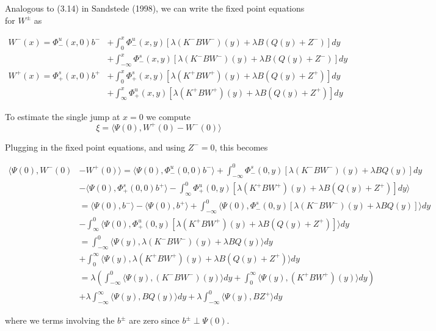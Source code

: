 \documentclass[12pt]{article}
\begin{document}
Analogous to (3.14) in Sandstede (1998), we can write the fixed point equations for $W^\pm$ as

\begin{align*}
W^-(x) = \Phi^u_-(x, 0)b^- &+ \int_0^x \Phi^u_-(x, y)[\lambda (K^- B W^-)(y) + \lambda B (Q(y) + Z^-) ] dy \\
&+ \int_{-\infty}^x \Phi^s_-(x, y)[\lambda (K^- B W^-)(y) + \lambda B (Q(y) + Z^-)] dy \\
W^+(x) = \Phi^s_+(x, 0)b^+ &+ \int_0^x \Phi^s_+(x, y)[\lambda (K^+ B W^+)(y) + \lambda B(Q(y) + Z^+)] dy \\
&+ \int_{\infty}^x \Phi^u_+(x, y)[\lambda (K^+ B W^+)(y) + \lambda B (Q(y) + Z^+) ] dy
\end{align*}

To estimate the single jump at $x = 0$ we compute
\[
\xi = \langle \Psi(0), W^+(0) - W^-(0) \rangle
\]

Plugging in the fixed point equations, and using $Z^- = 0$, this becomes

\begin{align*}
\langle\Psi(0), W^-(0) &- W^+(0)\rangle = \langle \Psi(0), \Phi^u_-(0, 0)b^- \rangle + \int_{-\infty}^0 \Phi^s_-(0, y)[\lambda (K^- B W^-)(y) + \lambda B Q(y) ] dy  \\
&- \langle \Psi(0), \Phi^s_+(0, 0)b^+ \rangle - \int_\infty^0 \Phi^u_+(0, y)[\lambda (K^+ B W^+)(y) + \lambda B (Q(y) + Z^+) ] dy \rangle\\
&= \langle \Psi(0), b^- \rangle - \langle \Psi(0), b^+ \rangle + \int_{-\infty}^0 \langle \Psi(0), \Phi^s_-(0, y)[\lambda (K^- B W^-)(y) + \lambda B Q(y) ] \rangle dy  \\
&- \int_\infty^0 \langle \Psi(0), \Phi^u_+(0, y)[\lambda (K^+ B W^+)(y) + \lambda B (Q(y) + Z^+) ] \rangle dy  \\
&= \int_{-\infty}^0 \langle \Psi(y), \lambda (K^- B W^-)(y) + \lambda B Q(y) \rangle dy \\
&+ \int_0^\infty \langle \Psi(y), \lambda (K^+ B W^+)(y) + \lambda B (Q(y) + Z^+)  \rangle dy \\
&= \lambda\left( \int_{-\infty}^0 \langle \Psi(y), (K^- B W^-)(y) \rangle dy + \int_0^\infty \langle \Psi(y), (K^+ B W^+)(y) \rangle dy \right) \\
&+ \lambda \int_{-\infty}^\infty \langle\Psi(y), BQ(y) \rangle dy + \lambda \int_{-\infty}^0 \langle \Psi(y), B Z^+ \rangle dy
\end{align*}

where we terms involving the $b^\pm$ are zero since $b^\pm \perp \Psi(0)$.\\
\end{document}
